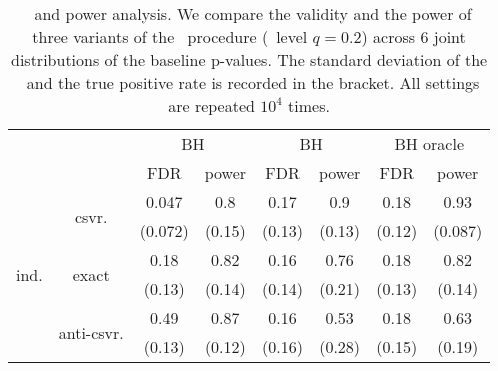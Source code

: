 \documentclass[a4paper,11pt]{article}
\theoremstyle{plain}
\theoremstyle{definition}
\theoremstyle{plain}
\newcommand{\nickname}{{\text{RANC}}}
\newcommand{\FDR}{\text{FDR}}
\newcommand{\FDRLevel}{q}
\newcommand{\FDP}{\text{FDP}}
\newcommand{\BH}{{\text{BH}}}
\begin{document}
\begin{table}[tbp]
  \centering
\caption{{\FDR~and power analysis. We compare the validity and the power of three variants of the \BH~procedure (\FDR~level $\FDRLevel = 0.2$) across $6$ joint distributions of the baseline p-values. The standard deviation of the \FDP~and the true positive rate is recorded in the bracket. All settings are repeated $10^4$ times.}}
\label{tab:simulation}
\begin{tabular}{cc|cc|cc|cc}
\toprule
\multicolumn{2}{c|}{\multirow{2}{*}{}}                                    & \multicolumn{2}{c|}{BH}              & \multicolumn{2}{c|}{BH \nickname}              & \multicolumn{2}{c}{BH oracle}                \\ \cline{3-8}
\multicolumn{2}{c|}{}
                                                                          & \multicolumn{1}{c|}{FDR}      & power & \multicolumn{1}{c|}{FDR} & power & \multicolumn{1}{c|}{FDR} & power\\
  \midrule
\multicolumn{1}{c|}{\multirow{6}{*}{ind.}}  & \multirow{2}{*}{csvr.}      & \multicolumn{1}{c|}{0.047}   & 0.8      & \multicolumn{1}{c|}{0.17}    & 0.9           & \multicolumn{1}{c|}{0.18}      & 0.93            \\
\multicolumn{1}{c|}{}                       &                             & \multicolumn{1}{c|}{(0.072)} & (0.15)   & \multicolumn{1}{c|}{(0.13)}  & (0.13)        & \multicolumn{1}{c|}{(0.12)}    & (0.087)         \\ \cline{2-8}
\multicolumn{1}{c|}{}                       & \multirow{2}{*}{exact}      & \multicolumn{1}{c|}{0.18}    & 0.82     & \multicolumn{1}{c|}{0.16}    & 0.76          & \multicolumn{1}{c|}{0.18}      & 0.82            \\
\multicolumn{1}{c|}{}                       &                             & \multicolumn{1}{c|}{(0.13)}  & (0.14)   & \multicolumn{1}{c|}{(0.14)}  & (0.21)        & \multicolumn{1}{c|}{(0.13)}    & (0.14)          \\ \cline{2-8}
\multicolumn{1}{c|}{}                       & \multirow{2}{*}{anti-csvr.} & \multicolumn{1}{c|}{0.49}    & 0.87     & \multicolumn{1}{c|}{0.16}    & 0.53          & \multicolumn{1}{c|}{0.18}      & 0.63            \\
\multicolumn{1}{c|}{}                       &                             & \multicolumn{1}{c|}{(0.13)}  & (0.12)   & \multicolumn{1}{c|}{(0.16)}  & (0.28)        & \multicolumn{1}{c|}{(0.15)}    & (0.19)          \\ \hline

\end{tabular}
\end{table}
\end{document}
